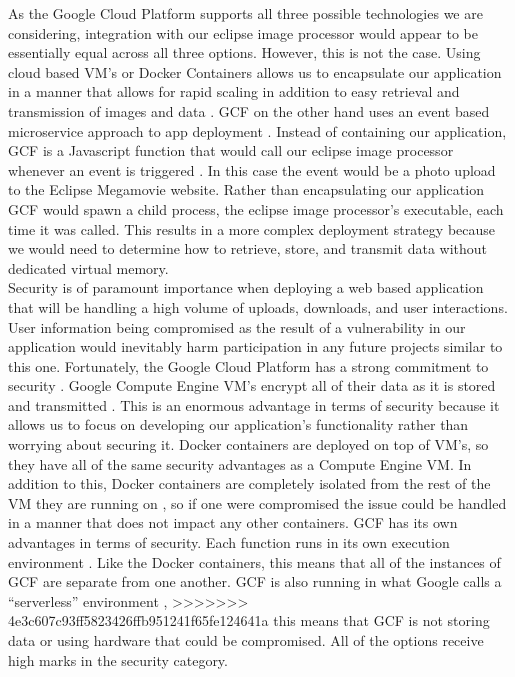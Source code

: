 \documentclass[10pt, onecolumn, draftclsnofoot, letterpaper, compsoc]{IEEEtran}
\begin{document}
As the Google Cloud Platform supports all three possible technologies we are
considering, integration with our eclipse image processor would appear to be
essentially equal across all three options. However, this is not the case. Using
cloud based VM's or Docker Containers allows us to encapsulate our application
in a manner that allows for rapid scaling in addition to easy retrieval and
transmission of images and data \cite{docker, gcp}. GCF on the other hand uses
an event based microservice approach to app deployment \cite{gcp}. Instead of
containing our application, GCF is a Javascript function that would call our
eclipse image processor whenever an event is triggered \cite{gcp}. In this case
the event would be a photo upload to the Eclipse Megamovie website. Rather than
encapsulating our application GCF would spawn a child process, the eclipse image
processor's executable, each time it was called. This results in a more complex
deployment strategy because we would need to determine how to retrieve, store,
and transmit data without dedicated virtual memory. \\

Security is of paramount importance when deploying a web based application that
will be handling a high volume of uploads, downloads, and user interactions.
User information being compromised as the result of a vulnerability in our
application would inevitably harm participation in any future projects similar
to this one. Fortunately, the Google Cloud Platform has a strong commitment to
security \cite{gcp}. Google Compute Engine VM's encrypt all of their data as it
is stored and transmitted \cite{gcp}. This is an enormous advantage in terms of
security because it allows us to focus on developing our application's
functionality rather than worrying about securing it. Docker containers are
deployed on top of VM's, so they have all of the same security advantages as a
Compute Engine VM. In addition to this, Docker containers are completely
isolated from the rest of the VM they are running on \cite{docker}, so if one
were compromised the issue could be handled in a manner that does not impact any
other containers. GCF has its own advantages in terms of security. Each function
runs in its own execution environment \cite{docker}. Like the Docker containers,
this means that all of the instances of GCF are separate from one another. GCF
is also running in what Google calls a ``serverless” environment \cite{docker},
>>>>>>> 4e3c607c93ff5823426ffb951241f65fe124641a
this means that GCF is not storing data or using hardware that could be
compromised. All of the options receive high marks in the security category. \\
\end{document}
